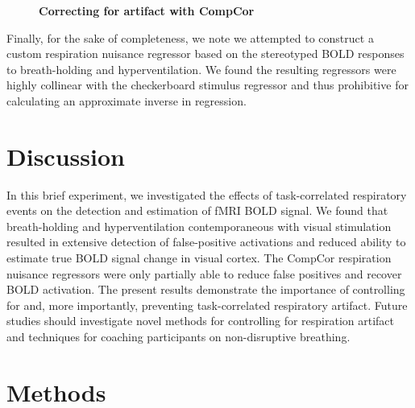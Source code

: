 \documentclass[9pt]{NEU502b-fmri}
\begin{document}
\begin{figure}
\centerline{%
%
}
\caption{\textbf{Correcting for artifact with CompCor}}

\end{figure}
Finally, for the sake of completeness, we note we attempted to construct a custom respiration nuisance regressor based on the stereotyped BOLD responses to breath-holding and hyperventilation. We found the resulting regressors were highly collinear with the checkerboard stimulus regressor and thus prohibitive for calculating an approximate inverse in regression.

\section{Discussion}

In this brief experiment, we investigated the effects of task-correlated respiratory events on the detection and estimation of fMRI BOLD signal. We found that breath-holding and hyperventilation contemporaneous with visual stimulation resulted in extensive detection of false-positive activations and reduced ability to estimate true BOLD signal change in visual cortex. The CompCor respiration nuisance regressors were only partially able to reduce false positives and recover BOLD activation. The present results demonstrate the importance of controlling for and, more importantly, preventing task-correlated respiratory artifact. Future studies should investigate novel methods for controlling for respiration artifact and techniques for coaching participants on non-disruptive breathing. 

\section{Methods}
\end{document}

